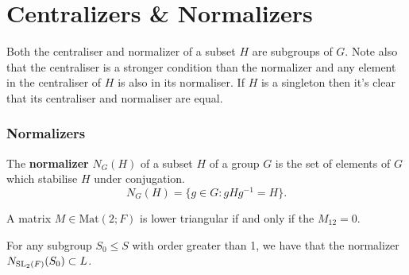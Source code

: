 \section{Centralizers \& Normalizers}

Both the centraliser and normalizer of a subset $H$ are subgroups of $G$. Note also that the centraliser is a stronger condition than the normalizer and any element in the centraliser of $H$ is also in its normaliser. If $H$ is a singleton then it's clear that its centraliser and normaliser are equal.\\

\subsubsection{Normalizers}

\begin{definition}
\leanok
The \textbf{normalizer} $N_G(H)$ of a subset $H$ of a group $G$ is the set of elements of $G$ which stabilise $H$ under conjugation.
\begin{equation*} N_G(H) = \{ g \in G : gHg^{-1}=H\}. \end{equation*}
\end{definition}


\begin{remark}
    \label{lower_triangular_iff_top_right_entry_eq_zero}
    \leanok
    A matrix $M \in \textrm{Mat}(2; F)$ is lower triangular if and only if the $M_{12} = 0$.
\end{remark}

\begin{proposition}
\label{normalizer_subgroup_S_le_L}
\leanok
 For any subgroup $S_0 \leq S$ with order greater than 1, we have that the normalizer $N_{\operatorname{SL}_2(F)}(S_0) \subset L$.
\end{proposition}

